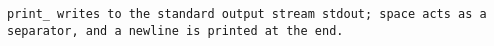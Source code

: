 \tt{print_} writes to the standard output stream \tt{stdout};
space acts as a separator, and a newline is printed at the end.

\subsubsection{}

